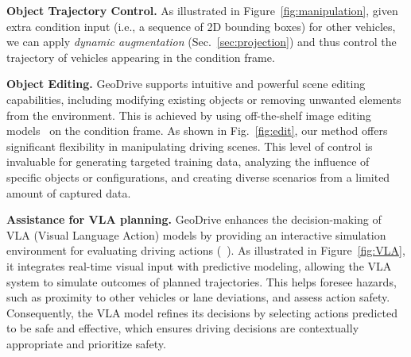 \documentclass{article}
\begin{document}
\textbf{Object Trajectory Control.}
As illustrated in Figure~\ref{fig:manipulation}, given extra condition input (i.e., a sequence of 2D bounding boxes) for other vehicles, we can apply \textit{dynamic augmentation} (Sec.~\ref{sec:projection}) and thus control the trajectory of vehicles appearing in the condition frame. 


\textbf{Object Editing.}
GeoDrive supports intuitive and powerful scene editing capabilities, including modifying existing objects or removing unwanted elements from the environment. This is achieved by using off-the-shelf image editing models~\cite{flux2024} on the condition frame. As shown in Fig.~\ref{fig:edit}, our method offers significant flexibility in manipulating driving scenes. This level of control is invaluable for generating targeted training data, analyzing the influence of specific objects or configurations, and creating diverse scenarios from a limited amount of captured data.

\textbf{Assistance for VLA planning.}
GeoDrive enhances the decision-making of VLA (Visual Language Action) models by providing an interactive simulation environment for evaluating driving actions (~\cite{zhou2025opendrivevlaendtoendautonomousdriving, tian2024drivevlmconvergenceautonomousdriving, zhao2025sce2drivexgeneralizedmllmframework, guo2025vdtautoendtoendautonomousdriving}). As illustrated in Figure~\ref{fig:VLA}, it integrates real-time visual input with predictive modeling, allowing the VLA system to simulate outcomes of planned trajectories. This helps foresee hazards, such as proximity to other vehicles or lane deviations, and assess action safety. Consequently, the VLA model refines its decisions by selecting actions predicted to be safe and effective, which ensures driving decisions are contextually appropriate and prioritize safety.




\end{document}
